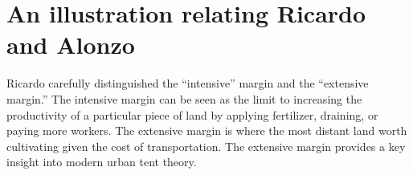 

\section{An illustration relating Ricardo and Alonzo} 
Ricardo carefully distinguished the ``intensive'' margin and the ``extensive margin.'' The intensive margin can be seen as the limit to increasing the productivity  of a particular piece of land by applying fertilizer, draining, or paying more workers. The extensive margin is where the most distant land worth cultivating given the cost of transportation. The extensive margin provides a key insight  into modern urban tent theory. 

